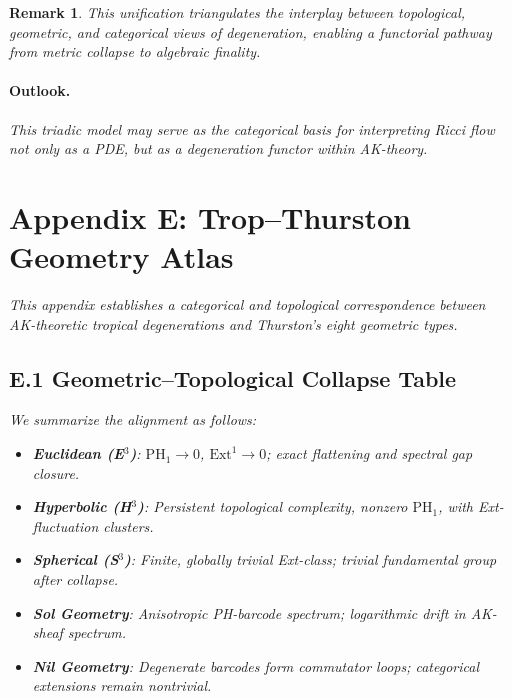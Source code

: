 \documentclass[11pt]{article}
\newtheorem{remark}[theorem]{Remark}
\begin{document}
\begin{remark}
This unification triangulates the interplay between topological, geometric, and categorical views of degeneration, enabling a functorial pathway from metric collapse to algebraic finality.

\paragraph{Outlook.}
This triadic model may serve as the categorical basis for interpreting Ricci flow not only as a PDE, but as a degeneration functor within AK-theory.




\section*{Appendix E: Trop–Thurston Geometry Atlas}

This appendix establishes a categorical and topological correspondence  
between AK-theoretic tropical degenerations and Thurston's eight geometric types.

\subsection*{E.1 Geometric–Topological Collapse Table}

We summarize the alignment as follows:

\begin{itemize}
  \item \textbf{Euclidean (E$^3$)}:  
  $\mathrm{PH}_1 \to 0$, $\mathrm{Ext}^1 \to 0$; exact flattening and spectral gap closure.

  \item \textbf{Hyperbolic (H$^3$)}:  
  Persistent topological complexity, nonzero $\mathrm{PH}_1$, with Ext-fluctuation clusters.

  \item \textbf{Spherical (S$^3$)}:  
  Finite, globally trivial Ext-class; trivial fundamental group after collapse.

  \item \textbf{Sol Geometry}:  
  Anisotropic PH-barcode spectrum; logarithmic drift in AK-sheaf spectrum.

  \item \textbf{Nil Geometry}:  
  Degenerate barcodes form commutator loops; categorical extensions remain nontrivial.


\end{itemize}
\end{remark}
\end{document}
